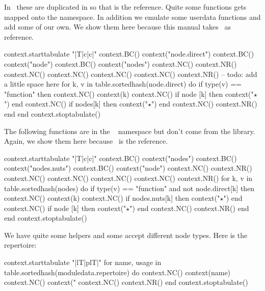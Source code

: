 In \CONTEXT\ these are duplicated in  so that is the reference.
Quite some functions gets mapped onto the  namespace. In addition we
emulate some userdata functions and add some of our own. We show them here because
this manual takes \CONTEXT\ as reference.

\starttworows
\startluacode
    context.starttabulate { "|T|c|c|" }
        context.BC() context("node.direct")
        context.BC() context("node")
        context.BC() context("nodes")
        context.NC() context.NR()
        context.NC()
        context.NC()
        context.NC()
        context.NC() context.NR()
        -- todo: add a little space here
        for k, v in table.sortedhash(node.direct) do
            if type(v) == "function" then
                context.NC() context(k)
                context.NC() if node [k] then context("$⋆$") end
                context.NC() if nodes[k] then context("$⋆$") end
                context.NC() context.NR()
            end
        end
    context.stoptabulate()
\stopluacode
\stoptworows

The following functions are in the \CONTEXT\  namespace but don't
come from the library. Again, we show them here because \CONTEXT\ is the
reference.

\starttworows
\startluacode
    context.starttabulate { "|T|c|c|" }
        context.BC() context("nodes")
        context.BC() context("nodes.nuts")
        context.BC() context("node")
        context.NC() context.NR()
        context.NC()
        context.NC()
        context.NC()
        context.NC() context.NR()
        for k, v in table.sortedhash(nodes) do
            if type(v) == "function" and not node.direct[k] then
                context.NC() context(k)
                context.NC() if nodes.nuts[k] then context("$⋆$") end
                context.NC() if node      [k] then context("$⋆$") end
                context.NC() context.NR()
            end
        end
    context.stoptabulate()
\stopluacode
\stoptworows

We have quite some helpers and some accept different node types. Here is the
repertoire:

\startluacode
    context.starttabulate { "|lT|plT|" }
    for name, usage in table.sortedhash(moduledata.repertoire) do
        context.NC() context(name)
        context.NC() context("%
        context.NC() context.NR()
    end
    context.stoptabulate()
\stopluacode

\stopsubsection

